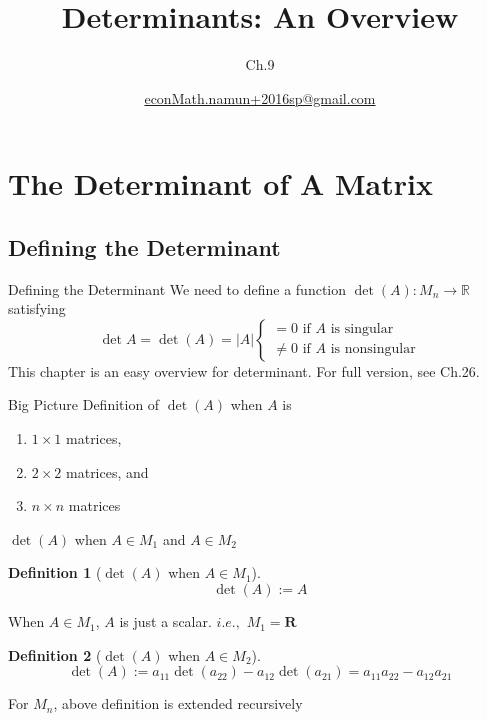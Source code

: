 \documentclass[a4paper,11pt]{article}
\author[조남운]{\url{econMath.namun+2016sp@gmail.com}}
\title{Determinants: An Overview}
\subtitle{Ch.9}
\newtheorem{defn}{Definition}
\begin{document}
	
\maketitle


\section{The Determinant of A Matrix} %
\label{sec:the_determinant_of_a_matrix}
\subsection{Defining the Determinant} %
\label{sub:defining_the_determinant}
\begin{frame}[t]{Defining the Determinant}
	We need to define a function $\det(A): M_n \rightarrow \mathbb{R}$ satisfying
	\[
		\det A = \det(A) = \vert A\vert \begin{cases}
			= 0 \text{ if $A$ is singular}\\
			\neq 0 \text{ if $A$ is nonsingular}
		\end{cases}
	\]
	This chapter is an easy overview for determinant. For full version, see Ch.26.
	\begin{block}
		{Big Picture}
		Definition of $\det(A)$ when $A$ is 
		\begin{enumerate}
			\item $1\times 1$ matrices,
			\item $2\times 2$ matrices, and
			\item $n\times n$ matrices
		\end{enumerate}
	\end{block}
\end{frame}
\begin{frame}[t]{$\det(A)$ when $A\in M_1$ and $A\in M_2$}
	\begin{defn}
		[$\det(A)$ when $A\in M_1$]
		\[
			\det(A):=A
		\]
	\end{defn}
	When $A\in M_1$, $A$ is just a scalar. $i.e.,$ $M_1 = \mathbf{R}$
	\begin{defn}
		[$\det(A)$ when $A\in M_2$]
		\[
			\det(A):= a_{11} \det(a_{22}) - a_{12}\det(a_{21}) =a_{11}a_{22}-a_{12}a_{21}
		\]
	\end{defn}
	For $M_n$, above definition is extended recursively
\end{frame}
\end{document}
